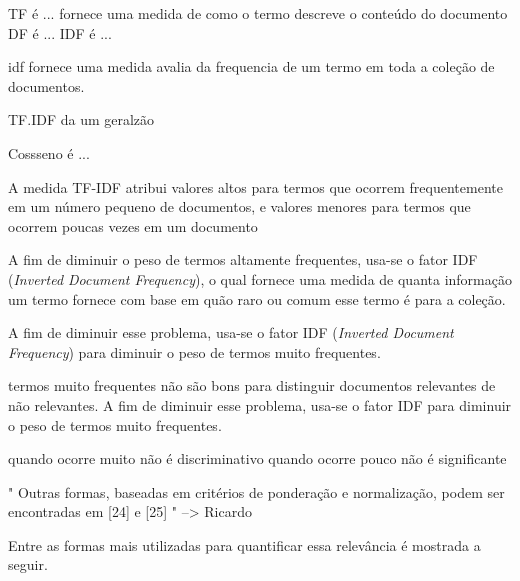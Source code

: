 



TF é ... fornece uma medida de como o termo descreve o conteúdo do documento
DF é ... 
IDF é ... 

idf fornece uma medida avalia da frequencia de um termo em toda a coleção de documentos.

TF.IDF da um geralzão



Cossseno é ... 


A medida TF-IDF atribui valores altos para termos que ocorrem frequentemente em um número pequeno de documentos, e valores menores para termos que ocorrem poucas vezes em um documento

A fim de diminuir o peso de termos altamente frequentes, usa-se o fator IDF (\textit{Inverted Document Frequency}), o qual fornece uma medida de quanta informação um termo fornece com base em quão raro ou comum esse termo é para a coleção.

A fim de diminuir esse problema, usa-se o fator IDF (\textit{Inverted Document Frequency}) para diminuir o peso de termos muito frequentes. 

termos muito frequentes não são bons para distinguir documentos relevantes de não relevantes. A fim de diminuir esse problema, usa-se o fator IDF para diminuir o peso de termos muito frequentes.




quando ocorre muito não é discriminativo
quando ocorre pouco não é significante




" Outras formas, baseadas em critérios de
ponderação e normalização, podem ser encontradas em
[24] e [25] " --> Ricardo







Entre as formas mais utilizadas para quantificar essa relevância é mostrada a seguir. 

